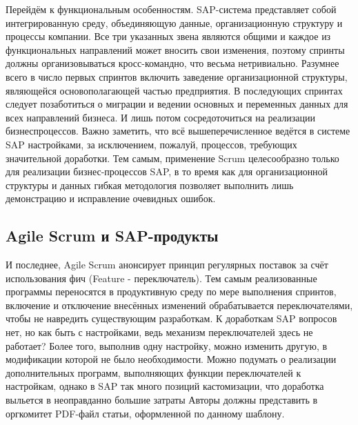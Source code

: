 \documentclass[12pt]{article}
\begin{document}
Перейдём к функциональным особенностям. SAP-система представляет собой
интегрированную среду, объединяющую данные, организационную структуру и
процессы компании. Все три указанных звена являются общими и каждое из
функциональных направлений может вносить свои изменения, поэтому спринты
должны организовываться кросс-командно, что весьма нетривиально. Разумнее всего в
число первых спринтов включить заведение организационной структуры, являющейся
основополагающей частью предприятия. В последующих спринтах следует
позаботиться о миграции и ведении основных и переменных данных для всех
направлений бизнеса. И лишь потом сосредоточиться на реализации бизнеспроцессов. Важно заметить, что всё вышеперечисленное ведётся в системе SAP
настройками, за исключением, пожалуй, процессов, требующих значительной
доработки. Тем самым, применение Scrum целесообразно только для реализации
бизнес-процессов SAP, в то время как для организационной структуры и данных
гибкая методология позволяет выполнить лишь демонстрацию и исправление
очевидных ошибок.

\subsection{Agile Scrum и SAP-продукты}

И последнее, Agile Scrum анонсирует принцип регулярных поставок за счёт
использования фич (Feature - переключатель). Тем самым реализованные программы
переносятся в продуктивную среду по мере выполнения спринтов, включение и
отключение внесённых изменений обрабатывается переключателями, чтобы не
навредить существующим разработкам. К доработкам SAP вопросов нет, но как быть с
настройками, ведь механизм переключателей здесь не работает? Более того,
выполнив одну настройку, можно изменить другую, в модификации которой не было
необходимости. Можно подумать о реализации дополнительных программ,
выполняющих функции переключателей к настройкам, однако в SAP так много
позиций кастомизации, что доработка выльется в неоправданно большие затраты
Авторы должны представить в оргкомитет PDF-файл статьи, оформленной по данному шаблону. 
\end{document}
